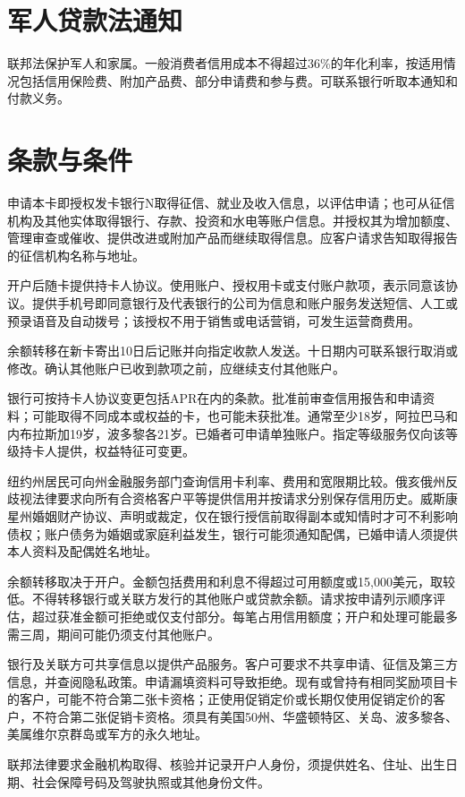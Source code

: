 \documentclass[UTF8,fontset=none,11pt,a4paper]{ctexart}
\begin{document}
\section*{军人贷款法通知}
联邦法保护军人和家属。一般消费者信用成本不得超过36\%的年化利率，按适用情况包括信用保险费、附加产品费、部分申请费和参与费。可联系银行听取本通知和\allowbreak\mbox{付款义务。}


\section*{条款与条件}
申请本卡即授权发卡银行N取得征信、就业及收入信息，以评估申请；也可从征信机构及其他实体取得银行、存款、投资和水电等账户信息。并授权其为增加额度、管理审查或催收、提供改进或附加产品而继续取得信息。应客户请求告知取得报告的征信机构名\allowbreak\mbox{称与地址。}


开户后随卡提供持卡人协议。使用账户、授权用卡或支付账户款项，表示同意该协议。提供手机号即同意银行及代表银行的公司为信息和账户服务发送短信、人工或预录语音及自动拨号；该授权不用于销售或电话营销，可发生运\allowbreak\mbox{营商费用。}


余额转移在新卡寄出10日后记账并向指定收款人发送。十日期内可联系银行取消或修改。确认其他账户已收到款项之前，应继续支付\allowbreak\mbox{其他账户。}


银行可按持卡人协议变更包括APR在内的条款。批准前审查信用报告和申请资料；可能取得不同成本或权益的卡，也可能未获批准。通常至少18岁，阿拉巴马和内布拉斯加19岁，波多黎各21岁。已婚者可申请单独账户。指定等级服务仅向该等级持卡人提供，权益特\allowbreak\mbox{征可变更。}


纽约州居民可向州金融服务部门查询信用卡利率、费用和宽限期比较。俄亥俄州反歧视法律要求向所有合资格客户平等提供信用并按请求分别保存信用历史。威斯康星州婚姻财产协议、声明或裁定，仅在银行授信前取得副本或知情时才可不利影响债权；账户债务为婚姻或家庭利益发生，银行可能须通知配偶，已婚申请人须提供本人资料及配偶\allowbreak\mbox{姓名地址。}


余额转移取决于开户。金额包括费用和利息不得超过可用额度或15,000美元，取较低。不得转移银行或关联方发行的其他账户或贷款余额。请求按申请列示顺序评估，超过获准金额可拒绝或仅支付部分。每笔占用信用额度；开户和处理可能最多需三周，期间可能仍须支付\allowbreak\mbox{其他账户。}


银行及关联方可共享信息以提供产品服务。客户可要求不共享申请、征信及第三方信息，并查阅隐私政策。申请漏填资料可导致拒绝。现有或曾持有相同奖励项目卡的客户，可能不符合第二张卡资格；正使用促销定价或长期仅使用促销定价的客户，不符合第二张促销卡资格。须具有美国50州、华盛顿特区、关岛、波多黎各、美属维尔京群岛或军方的永\allowbreak\mbox{久地址。}


联邦法律要求金融机构取得、核验并记录开户人身份，须提供姓名、住址、出生日期、社会保障号码及驾驶执照或其他\allowbreak\mbox{身份文件。}
\end{document}

